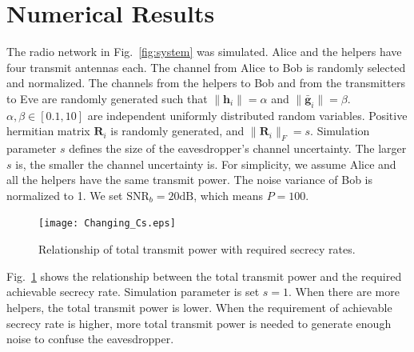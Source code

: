 \documentclass[12pt,journal,draftclsnofoot,onecolumn]{IEEEtran}
\begin{document}
%
%
%



\section{Numerical Results} \label{sec:numerical results}
The radio network in Fig.~\ref{fig:system} was simulated. Alice and the helpers have four transmit antennas each. The channel from Alice to Bob is randomly selected and normalized. The channels from the helpers to Bob and from the transmitters to Eve are randomly generated such that $\|\mathbf{h}_i\| = \alpha$ and $\|\bar{\mathbf{g}}_i\| = \beta$. $\alpha,\beta\in  [0.1,10]$ are independent uniformly distributed random variables.
Positive hermitian matrix $\mathbf{R}_i$ is randomly generated, and $\|\mathbf{R}_i\|_F = s$. Simulation parameter $s$ defines the size of the eavesdropper's channel uncertainty. The larger $s$ is, the smaller the channel uncertainty is. 
For simplicity, we assume Alice and all the helpers have the same transmit power. 
The noise variance of Bob is normalized to 1. We set $\mathrm{SNR}_b = 20 \mathrm{dB}$, which means $P = 100$.


\begin{figure}[!ht]
	\centering
	\texttt{[image: Changing\_Cs.eps]} %
	\caption{Relationship of total transmit power with required secrecy rates.}
	\label{fig:Changing_Cs}
\end{figure}

Fig.~\ref{fig:Changing_Cs} shows the relationship between the total transmit power and the required achievable secrecy rate. Simulation parameter is set $s = 1$. When there are more helpers, the total transmit power is lower. 
When the requirement of achievable secrecy rate is higher, more total transmit power is needed to generate enough noise to confuse the eavesdropper. %
\end{document}
